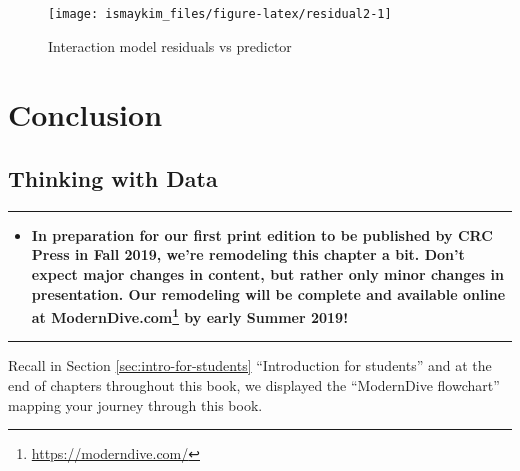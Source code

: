 \documentclass[12pt, krantz2,]{krantz}
\renewcommand{\href}[2]{#2\footnote{\url{#1}}}
\newenvironment{rmdblock}[1]
  {\begin{shaded*}
  \begin{itemize}
  \renewcommand{\labelitemi}{
    \raisebox{-.7\height}[0pt][0pt]{
    }
  }
  \item
  }
  {
  \end{itemize}
  \end{shaded*}
  }
\newenvironment{announcement}
  {\begin{rmdblock}{warning}}
  {\end{rmdblock}}
\begin{document}
\begin{figure}

{\centering \texttt{[image: ismaykim\_files/figure-latex/residual2-1]} 

}

\caption{Interaction model residuals vs predictor}\label{fig:residual2}
\end{figure}

\hypertarget{part-conclusion}{%
\part{Conclusion}\label{part-conclusion}}

\hypertarget{thinking-with-data}{%
\chapter{Thinking with Data}\label{thinking-with-data}}

\begin{center}\rule{0.5\linewidth}{\linethickness}\end{center}

\begin{announcement}
\textbf{In preparation for our first print edition to be published by
CRC Press in Fall 2019, we're remodeling this chapter a bit. Don't
expect major changes in content, but rather only minor changes in
presentation. Our remodeling will be complete and available online at
\href{https://moderndive.com/}{ModernDive.com} by early Summer 2019!}
\end{announcement}

\begin{center}\rule{0.5\linewidth}{\linethickness}\end{center}

Recall in Section \ref{sec:intro-for-students} ``Introduction for students'' and at the end of chapters throughout this book, we displayed the ``ModernDive flowchart'' mapping your journey through this book.
\end{document}
